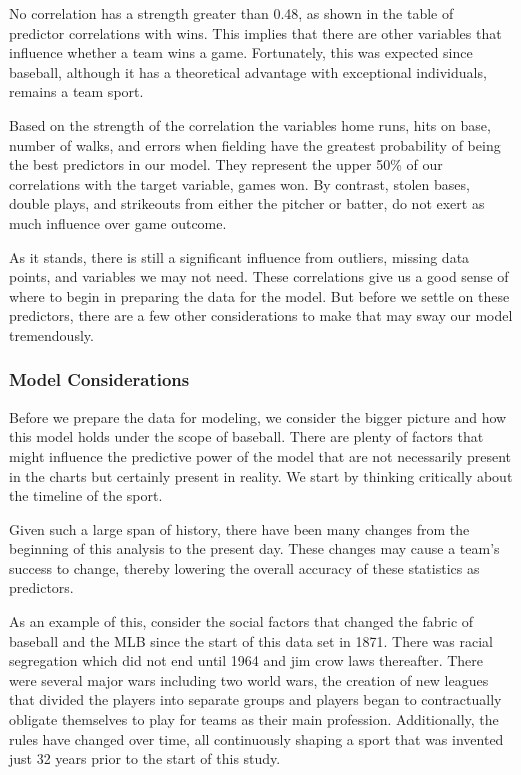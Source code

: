 \documentclass[
]{article}
\begin{document}
No correlation has a strength greater than 0.48, as shown in the table
of predictor correlations with wins. This implies that there are other
variables that influence whether a team wins a game. Fortunately, this
was expected since baseball, although it has a theoretical advantage
with exceptional individuals, remains a team sport.

Based on the strength of the correlation the variables home runs, hits
on base, number of walks, and errors when fielding have the greatest
probability of being the best predictors in our model. They represent
the upper 50\% of our correlations with the target variable, games won.
By contrast, stolen bases, double plays, and strikeouts from either the
pitcher or batter, do not exert as much influence over game outcome.

As it stands, there is still a significant influence from outliers,
missing data points, and variables we may not need. These correlations
give us a good sense of where to begin in preparing the data for the
model. But before we settle on these predictors, there are a few other
considerations to make that may sway our model tremendously.

\hypertarget{model-considerations}{%
\subsubsection{Model Considerations}\label{model-considerations}}

Before we prepare the data for modeling, we consider the bigger picture
and how this model holds under the scope of baseball. There are plenty
of factors that might influence the predictive power of the model that
are not necessarily present in the charts but certainly present in
reality. We start by thinking critically about the timeline of the
sport.

Given such a large span of history, there have been many changes from
the beginning of this analysis to the present day. These changes may
cause a team's success to change, thereby lowering the overall accuracy
of these statistics as predictors.

As an example of this, consider the social factors that changed the
fabric of baseball and the MLB since the start of this data set in 1871.
There was racial segregation which did not end until 1964 and jim crow
laws thereafter. There were several major wars including two world wars,
the creation of new leagues that divided the players into separate
groups and players began to contractually obligate themselves to play
for teams as their main profession. Additionally, the rules have changed
over time, all continuously shaping a sport that was invented just 32
years prior to the start of this study.
\end{document}
